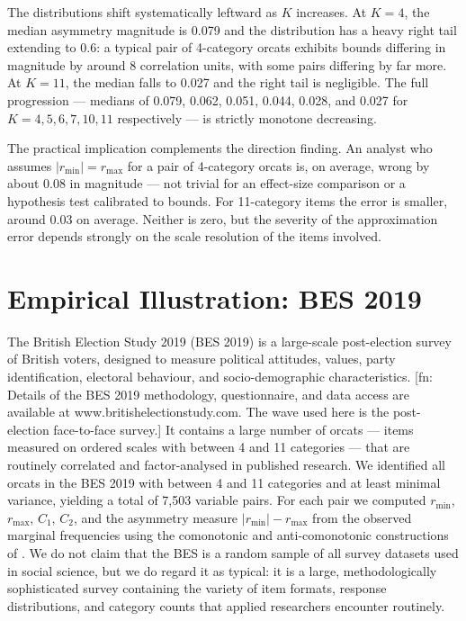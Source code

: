 \documentclass[
  12pt,
]{article}
\theoremstyle{plain}
\theoremstyle{definition}
\theoremstyle{remark}
\begin{document}
The distributions shift systematically leftward as \(K\) increases. At
\(K = 4\), the median asymmetry magnitude is 0.079 and the distribution
has a heavy right tail extending to 0.6: a typical pair of 4-category
orcats exhibits bounds differing in magnitude by around 8 correlation
units, with some pairs differing by far more. At \(K = 11\), the median
falls to 0.027 and the right tail is negligible. The full progression
--- medians of 0.079, 0.062, 0.051, 0.044, 0.028, and 0.027 for
\(K = 4, 5, 6, 7, 10, 11\) respectively --- is strictly monotone
decreasing.

The practical implication complements the direction finding. An analyst
who assumes \(|r_{\min}| = r_{\max}\) for a pair of 4-category orcats
is, on average, wrong by about 0.08 in magnitude --- not trivial for an
effect-size comparison or a hypothesis test calibrated to bounds. For
11-category items the error is smaller, around 0.03 on average. Neither
is zero, but the severity of the approximation error depends strongly on
the scale resolution of the items involved.

\section{Empirical Illustration: BES 2019}\label{sec-bes}

The British Election Study 2019 (BES 2019) is a large-scale
post-election survey of British voters, designed to measure political
attitudes, values, party identification, electoral behaviour, and
socio-demographic characteristics. {[}fn: Details of the BES 2019
methodology, questionnaire, and data access are available at
www.britishelectionstudy.com. The wave used here is the post-election
face-to-face survey.{]} It contains a large number of orcats --- items
measured on ordered scales with between 4 and 11 categories --- that are
routinely correlated and factor-analysed in published research. We
identified all orcats in the BES 2019 with between 4 and 11 categories
and at least minimal variance, yielding a total of 7,503 variable pairs.
For each pair we computed \(r_{\min}\), \(r_{\max}\), \(C_1\), \(C_2\),
and the asymmetry measure \(|r_{\min}| - r_{\max}\) from the observed
marginal frequencies using the comonotonic and anti-comonotonic
constructions of . We do not claim that the BES
is a random sample of all survey datasets used in social science, but we
do regard it as typical: it is a large, methodologically sophisticated
survey containing the variety of item formats, response distributions,
and category counts that applied researchers encounter routinely.
\end{document}
